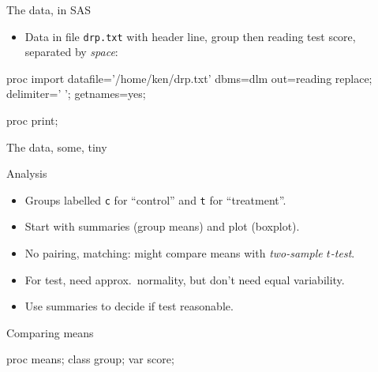\documentclass[unknownkeysallowed]{beamer}\usepackage[]{graphicx}\usepackage[]{color}
\begin{document}
\begin{frame}[fragile]{The data, in SAS}

  \begin{itemize}
    \item Data in file \texttt{drp.txt} with header line, group then
    reading test score, separated by \emph{space}:
  \end{itemize}

\begin{Datastep}
proc import
  datafile='/home/ken/drp.txt'
  dbms=dlm
  out=reading
  replace;
  delimiter=' ';
  getnames=yes;
\end{Datastep}
\begin{Sascode}[store=ix]
  proc print;
\end{Sascode}
  
\end{frame}


\begin{frame}[fragile]{The data, some, tiny}

  
\end{frame}


\begin{frame}[fragile]{Analysis}

  \begin{itemize}
    \item Groups labelled \texttt{c} for ``control'' and \texttt{t}
      for ``treatment''.
    \item Start with summaries (group means) and plot (boxplot).
  \item No pairing, matching: might compare means with \emph{two-sample $t$-test}.
  \item For test, need approx.\ normality, but don't need equal variability.
    \item Use summaries to decide if test reasonable.

  \end{itemize}
  
\end{frame}

\begin{frame}[fragile]{Comparing means}

\begin{Sascode}[store=if]
  proc means;
    class group;
    var score;
\end{Sascode}

  
\end{frame}
\end{document}
